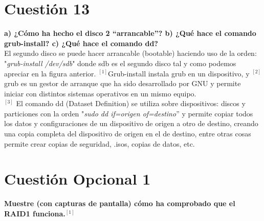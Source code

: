 \documentclass[a4paper, 11pt]{article} %
\begin{document}
\section{Cuestión 13}
\textbf{a) ¿Cómo ha hecho el disco 2 “arrancable”? b) ¿Qué hace el comando grub-install? c) ¿Qué hace el comando dd?} \\ 

El segundo disco se puede hacer arrancable (bootable) haciendo uso de la orden: "\textit{grub-install /dev/sdb}" donde sdb es el segundo disco tal y como podemos apreciar en la figura anterior. $^{[1]}$Grub-install instala grub en un dispositivo, y $^{[2]}$ grub es un gestor de arranque que ha sido desarrollado por GNU y permite iniciar con distintos sistemas operativos en un mismo equipo.\\
$^{[3]}$ El comando dd (Dataset Definition) se utiliza sobre dispositivos: discos y particiones con la orden "\textit{sudo dd if=origen of=destino}'' y permite copiar todos los datos y configuraciones de un dispositivo de origen a otro de destino, creando una copia completa del dispositivo de origen en el de destino, entre otras cosas permite crear copias de seguridad, .isos, copias de datos, etc.

\section{Cuestión Opcional 1}

\textbf{Muestre (con capturas de pantalla) cómo ha comprobado que el RAID1 funciona.$^{[1]}$}\\ 
\end{document}
